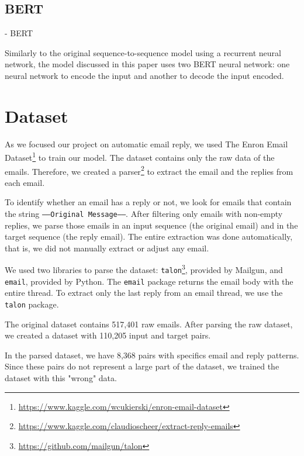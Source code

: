 \documentclass[letterpaper]{article}
\begin{document}
\subsection{BERT}

\cite{DBLP:journals/corr/abs-1810-04805} - BERT

Similarly to the original sequence-to-sequence model using a recurrent neural network, the model discussed in this paper uses two BERT neural network: one neural network to encode the input and another to decode the input encoded. 


\section{Dataset}

As we focused our project on automatic email reply, we used The Enron Email Dataset\footnote{\href{https://www.kaggle.com/wcukierski/enron-email-dataset}{https://www.kaggle.com/wcukierski/enron-email-dataset}} to train our model. The dataset contains only the raw data of the emails. Therefore, we created a parser\footnote{\href{https://www.kaggle.com/claudioscheer/extract-reply-emails}{https://www.kaggle.com/claudioscheer/extract-reply-emails}} to extract the email and the replies from each email.

To identify whether an email has a reply or not, we look for emails that contain the string \texttt{-----Original Message-----}. After filtering only emails with non-empty replies, we parse those emails in an input sequence (the original email) and in the target sequence (the reply email). The entire extraction was done automatically, that is, we did not manually extract or adjust any email.

We used two libraries to parse the dataset: \texttt{talon}\footnote{\href{https://github.com/mailgun/talon}{https://github.com/mailgun/talon}}, provided by Mailgun, and \texttt{email}, provided by Python. The \texttt{email} package returns the email body with the entire thread. To extract only the last reply from an email thread, we use the \texttt{talon} package.

The original dataset contains 517,401 raw emails. After parsing the raw dataset, we created a dataset with 110,205 input and target pairs.

In the parsed dataset, we have 8,368 pairs with specifics email and reply patterns. Since these pairs do not represent a large part of the dataset, we trained the dataset with this "wrong" data.




\end{document}
